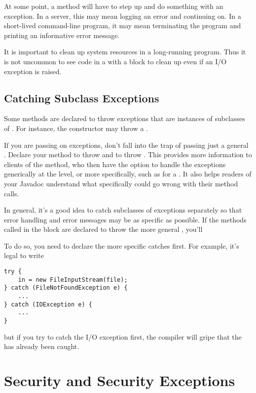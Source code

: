 At some point, a method will have to step up and do something with an
exception.  In a server, this may mean logging an error and continuing
on.  In a short-lived command-line program, it may mean terminating
the program and printing an informative error message.  

It is important to clean up system resources in a long-running
program.  Thus it is not uncommon to see code in a  with a
 block to clean up even if an I/O exception is raised.

\subsection{Catching Subclass Exceptions} 

Some methods are declared to throw exceptions that are instances
of subclasses of .  For instance, the constructor
 may throw a .

If you are passing on exceptions, don't fall into the trap of
passing just a general .  Declare your method
to throw  and to throw .
This provides more information to clients of the method, who then have
the option to handle the exceptions generically at the 
level, or more specifically, such as for a .
It also helps readers of your Javadoc understand what specifically could
go wrong with their method calls.

In general, it's a good idea to catch subclasses of exceptions
separately so that error handling and error messages may be as
specific as possible.  If the methods called in the  block
are declared to throw the more general , you'll

To do so, you need to declare the more specific catches first.  For
example, it's legal to write
%
\begin{verbatim}
try {
    in = new FileInputStream(file);
} catch (FileNotFoundException e) { 
    ...
} catch (IOException e) {
    ...
}
\end{verbatim}
%
but if you try to catch the I/O exception first, the compiler will gripe that the
 has already been caught.



\section{Security and Security Exceptions}

